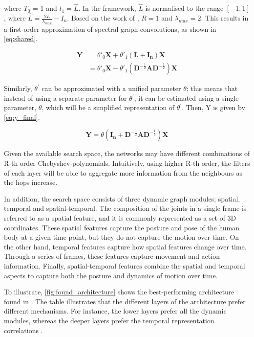 where $T_0$ = 1 and $t_1 = \hat{L}$. In the framework, $\hat{L}$ is normalised to the range $[-1,1]$, where $\hat{L} = \frac{2L}{\lambda_{max}} - I_n$. Based on the work of \autocite{DBLP:journals/corr/KipfW16}, $R = 1$ and $\lambda_{max} = 2$. This results in a first-order approximation of spectral graph convolutions, as shown in \cref{eq:shared}. 


\begin{equation}
\begin{aligned}
    \bm{Y} &= \theta'_0 \bm{X} + \theta'_1 (\bm{L} + \bm{I_n})\bm{X} \\
    &= \theta'_0 \bm{X} - \theta'_1(\bm{D}^{-\frac{1}{2}}\bm{A}\bm{D}^{-\frac{1}{2}})\bm{X}
\end{aligned}
\label{eq:shared}
\end{equation}

Similarly, $\theta^{'}$ can be approximated with a unified parameter $\theta$; this means that instead of using a separate parameter for $\theta^{'}$, it can be estimated using a single parameter, $\theta$, which will be a simplified representation of $\theta^{'}$. Then, Y is given by \cref{eq:y_final}. 

\begin{equation}
\bm{Y} = \theta (\bm{I_n} + \bm{D}^{-\frac{1}{2}}\bm{A}\bm{D}^{-\frac{1}{2}})\bm{X}
\label{eq:y_final}
\end{equation}

Given the available search space, the networks may have different combinations of R-th order Chebyshev-polynomials. Intuitively, using higher R-th order, the filters of each layer will be able to aggregate more information from the neighbours as the hops increase. 

In addition, the search space consists of three dynamic graph modules; spatial, temporal and spatial-temporal. The composition of the joints in a single frame is referred to as a spatial feature, and it is commonly represented as a set of 3D coordinates. These spatial features capture the posture and pose of the human body at a given time point, but they do not capture the motion over time. On the other hand, temporal features capture how spatial features change over time. Through a series of frames, these features capture movement and action information. Finally, spatial-temporal features combine the spatial and temporal aspects to capture both the posture and dynamics of motion over time.  

To illustrate, \cref{fig:found_architecture} shows the best-performing architecture found in \cite{peng2020learning}. The table illustrates that the different layers of the architecture prefer different mechanisms. For instance, the lower layers prefer all the dynamic modules, whereas the deeper layers prefer the temporal representation correlations \autocite{peng2020learning}. 

